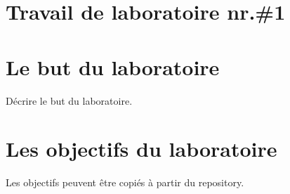 \section*{Travail de laboratoire nr.\#1}

\section{Le but du laboratoire}

Décrire le but du laboratoire.

\section{Les objectifs du laboratoire}
Les objectifs peuvent être copiés à partir du repository.

\clearpage
